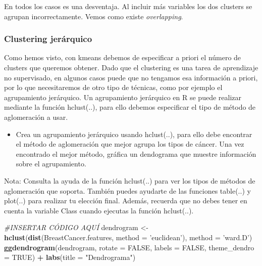 \documentclass[
]{article}
\newenvironment{Shaded}{\begin{snugshade}}{\end{snugshade}}
\newcommand{\CommentTok}[1]{\textcolor[rgb]{0.56,0.35,0.01}{\textit{#1}}}
\newcommand{\DataTypeTok}[1]{\textcolor[rgb]{0.13,0.29,0.53}{#1}}
\newcommand{\KeywordTok}[1]{\textcolor[rgb]{0.13,0.29,0.53}{\textbf{#1}}}
\newcommand{\NormalTok}[1]{#1}
\newcommand{\OperatorTok}[1]{\textcolor[rgb]{0.81,0.36,0.00}{\textbf{#1}}}
\newcommand{\OtherTok}[1]{\textcolor[rgb]{0.56,0.35,0.01}{#1}}
\newcommand{\StringTok}[1]{\textcolor[rgb]{0.31,0.60,0.02}{#1}}
\providecommand{\tightlist}{%
  \setlength{\itemsep}{0pt}\setlength{\parskip}{0pt}}
\begin{document}
En todos los casos es una desventaja. Al incluir más variables los dos
clusters se agrupan incorrectamente. Vemos como existe
\emph{overlapping}.

\hypertarget{clustering-jeruxe1rquico}{%
\subsubsection{Clustering jerárquico}\label{clustering-jeruxe1rquico}}

Como hemos visto, con kmeans debemos de especificar a priori el número
de clusters que queremos obtener. Dado que el clustering es una tarea de
aprendizaje no supervisado, en algunos casos puede que no tengamos esa
información a priori, por lo que necesitaremos de otro tipo de técnicas,
como por ejemplo el agrupamiento jerárquico. Un agrupamiento jerárquico
en R se puede realizar mediante la función hclust(..), para ello debemos
especificar el tipo de método de aglomeración a usar.

\begin{itemize}
\tightlist
\item
  Crea un agrupamiento jerárquico usando hclust(..), para ello debe
  encontrar el método de aglomeración que mejor agrupa los tipos de
  cáncer. Una vez encontrado el mejor método, gráfica un dendograma que
  muestre información sobre el agrupamiento.
\end{itemize}

Nota: Consulta la ayuda de la función hclust(..) para ver los tipos de
métodos de aglomeración que soporta. También puedes ayudarte de las
funciones table(..) y plot(..) para realizar tu elección final. Además,
recuerda que no debes tener en cuenta la variable Class cuando ejecutas
la función hclust(..).

\begin{Shaded}
\begin{Highlighting}[]
\CommentTok{#INSERTAR CÓDIGO AQUÍ}
\NormalTok{dendrogram <-}\StringTok{ }\KeywordTok{hclust}\NormalTok{(}\KeywordTok{dist}\NormalTok{(BreastCancer.features, }\DataTypeTok{method =} \StringTok{'euclidean'}\NormalTok{), }\DataTypeTok{method =} \StringTok{'ward.D'}\NormalTok{)}
\KeywordTok{ggdendrogram}\NormalTok{(dendrogram, }\DataTypeTok{rotate =} \OtherTok{FALSE}\NormalTok{, }\DataTypeTok{labels =} \OtherTok{FALSE}\NormalTok{, }\DataTypeTok{theme_dendro =} \OtherTok{TRUE}\NormalTok{) }\OperatorTok{+}\StringTok{ }\KeywordTok{labs}\NormalTok{(}\DataTypeTok{title =} \StringTok{"Dendrograma"}\NormalTok{)}
\end{Highlighting}
\end{Shaded}
\end{document}
